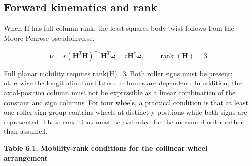 \subsection{Forward kinematics and rank}\label{forward-kinematics-and-rank}

When H has full column rank, the least-squares body twist follows from
the Moore-Penrose pseudoinverse.

\begin{equation}
\boldsymbol{\nu}=r\left(\mathbf{H}^{T}\mathbf{H}\right)^{-1}\mathbf{H}^{T}\boldsymbol{\omega}
=r\mathbf{H}^{\dagger}\boldsymbol{\omega},\qquad \operatorname{rank}(\mathbf{H})=3
\label{eq:6-4}
\end{equation}

Full planar mobility requires rank(H)=3. Both roller signs must be
present; otherwise the longitudinal and lateral columns are dependent.
In addition, the axial-position column must not be expressible as a
linear combination of the constant and sign columns. For four wheels, a
practical condition is that at least one roller-sign group contains
wheels at distinct y positions while both signs are represented. These
conditions must be evaluated for the measured order rather than assumed.

\par\medskip\noindent\singlespacing
{}
\textbf{Table 6.1. Mobility-rank conditions for the collinear wheel arrangement}\par

